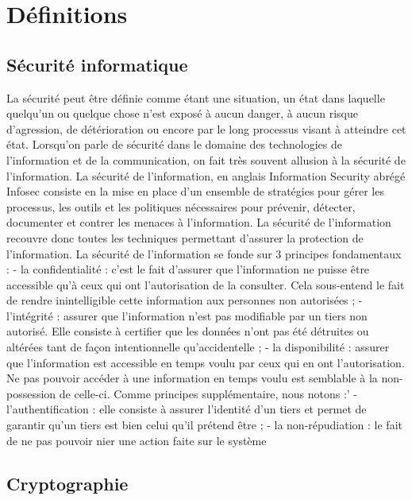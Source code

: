 \chapter{Définitions}

\section{Sécurité informatique}

La sécurité peut être définie comme étant une situation, un état dans laquelle quelqu’un ou quelque chose n’est exposé à aucun danger, à aucun risque d’agression, de détérioration ou encore par le long processus visant à atteindre cet état. 
Lorsqu’on parle de sécurité dans le domaine des technologies de l’information et de la communication, on fait très souvent allusion à la sécurité de l’information. La sécurité de l'information, en anglais Information Security abrégé Infosec consiste en la mise en place d’un ensemble de stratégies pour gérer les processus, les outils et les politiques nécessaires pour prévenir, détecter, documenter et contrer les menaces à l'information. La sécurité de l’information recouvre donc toutes les techniques permettant d’assurer la protection de l’information.  La sécurité de l’information se fonde sur 3 principes fondamentaux :
-	la confidentialité : c’est le fait d’assurer que l’information ne puisse être accessible qu’à ceux qui ont l’autorisation de la consulter. Cela sous-entend le fait de rendre inintelligible cette information aux personnes non autorisées ;
-	l’intégrité : assurer que l’information n’est pas modifiable par un tiers non autorisé. Elle consiste à certifier que les données n’ont pas été détruites ou altérées tant de façon intentionnelle qu’accidentelle ;
-	la disponibilité : assurer que l’information est accessible en temps voulu par ceux qui en ont l’autorisation. Ne pas pouvoir accéder à une information en temps voulu est semblable à la non-possession de celle-ci.
Comme principes supplémentaire, nous notons :’
-	l’authentification : elle consiste à assurer l’identité d’un tiers et permet de garantir qu’un tiers est bien celui qu’il prétend être ;
-	la non-répudiation : le fait de ne pas pouvoir nier une action faite sur le système


\section{Cryptographie}

